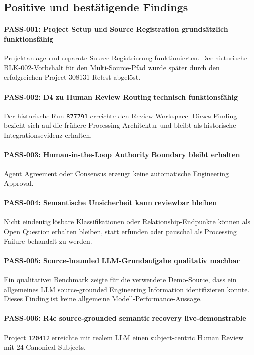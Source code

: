 \subsection{Positive und bestätigende Findings}

\paragraph{PASS-001: Project Setup und Source Registration grundsätzlich funktionsfähig}
Projektanlage und separate Source-Registrierung funktionierten. Der historische
BLK-002-Vorbehalt für den Multi-Source-Pfad wurde später durch den erfolgreichen
Project-308131-Retest abgelöst.

\paragraph{PASS-002: D4 zu Human Review Routing technisch funktionsfähig}
Der historische Run \texttt{877791} erreichte den Review Workspace. Dieses Finding
bezieht sich auf die frühere Processing-Architektur und bleibt als historische
Integrationsevidenz erhalten.

\paragraph{PASS-003: Human-in-the-Loop Authority Boundary bleibt erhalten}
Agent Agreement oder Consensus erzeugt keine automatische Engineering Approval.

\paragraph{PASS-004: Semantische Unsicherheit kann reviewbar bleiben}
Nicht eindeutig lösbare Klassifikationen oder Relationship-Endpunkte können als
Open Question erhalten bleiben, statt erfunden oder pauschal als Processing Failure
behandelt zu werden.

\paragraph{PASS-005: Source-bounded LLM-Grundaufgabe qualitativ machbar}
Ein qualitativer Benchmark zeigte für die verwendete Demo-Source, dass ein
allgemeines LLM source-grounded Engineering Information identifizieren konnte.
Dieses Finding ist keine allgemeine Modell-Performance-Aussage.

\paragraph{PASS-006: R4c source-grounded semantic recovery live-demonstrable}
Project \texttt{120412} erreichte mit realem LLM einen subject-centric Human Review
mit 24 Canonical Subjects.

